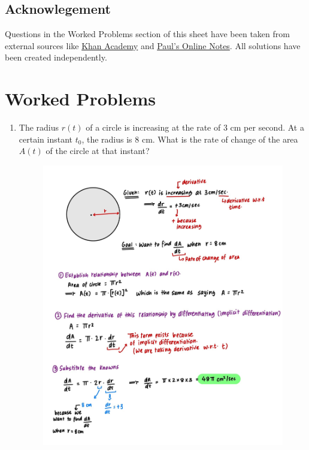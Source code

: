 \documentclass{article}
\begin{document}
\subsection*{Acknowlegement}
Questions in the Worked Problems section of this sheet have been taken from external sources like \href{https://www.khanacademy.org/math/ap-calculus-ab/ab-diff-contextual-applications-new/ab-4-5/e/related-rates}{Khan Academy} and \href{https://tutorial.math.lamar.edu/classes/calci/relatedrates.aspx}{Paul's Online Notes}. All solutions have been created independently.

\pagebreak
\section*{Worked Problems}
\label{WorkedProblems}
\begin{enumerate}
    \item The radius $r(t)$ of a circle is increasing at the rate of 3 cm per second. At a certain instant $t_0$, the radius is 8 cm. What is the rate of change of the area $A(t)$ of the circle at that instant?
    \begin{figure}[H]
        \centering
        \includegraphics[width=0.8\linewidth]{Q1.jpg}
        \label{fig:Q1}
    \end{figure}
    

\end{enumerate}
\end{document}
